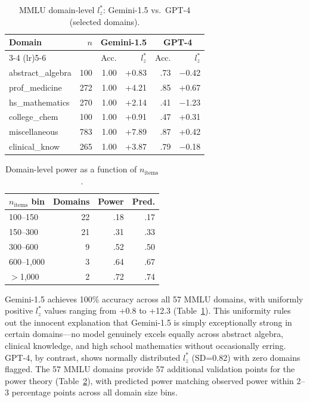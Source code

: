 \documentclass[11pt,a4paper]{article}
\begin{document}
\begin{table}[t]
\centering
\caption{MMLU domain-level $l_z^*$: Gemini-1.5 vs.\ GPT-4 (selected domains).}
\label{tab:domain}
\small
\begin{tabular}{lrrrrr}
\toprule
\textbf{Domain} & $n$ & \multicolumn{2}{c}{\textbf{Gemini-1.5}} & \multicolumn{2}{c}{\textbf{GPT-4}} \\
\cmidrule(lr){3-4} \cmidrule(lr){5-6}
 & & Acc. & $l_z^*$ & Acc. & $l_z^*$ \\
\midrule
abstract\_algebra & 100 & 1.00 & +0.83 & .73 & $-$0.42 \\
prof\_medicine & 272 & 1.00 & +4.21 & .85 & +0.67 \\
hs\_mathematics & 270 & 1.00 & +2.14 & .41 & $-$1.23 \\
college\_chem & 100 & 1.00 & +0.91 & .47 & +0.31 \\
miscellaneous & 783 & 1.00 & +7.89 & .87 & +0.42 \\
clinical\_know & 265 & 1.00 & +3.87 & .79 & $-$0.18 \\
\bottomrule
\end{tabular}
\end{table}

\begin{table}[t]
\centering
\caption{Domain-level power as a function of $n_{\text{items}}$.}
\label{tab:domain-power}
\small
\begin{tabular}{lrrr}
\toprule
$n_{\text{items}}$ \textbf{bin} & \textbf{Domains} & \textbf{Power} & \textbf{Pred.} \\
\midrule
100--150 & 22 & .18 & .17 \\
150--300 & 21 & .31 & .33 \\
300--600 & 9 & .52 & .50 \\
600--1{,}000 & 3 & .64 & .67 \\
$>$1{,}000 & 2 & .72 & .74 \\
\bottomrule
\end{tabular}
\end{table}

Gemini-1.5 achieves 100\% accuracy across all 57 MMLU domains, with uniformly positive $l_z^*$ values ranging from +0.8 to +12.3 (Table~\ref{tab:domain}). This uniformity rules out the innocent explanation that Gemini-1.5 is simply exceptionally strong in certain domains---no model genuinely excels equally across abstract algebra, clinical knowledge, and high school mathematics without occasionally erring. GPT-4, by contrast, shows normally distributed $l_z^*$ (SD=0.82) with zero domains flagged. The 57 MMLU domains provide 57 additional validation points for the power theory (Table~\ref{tab:domain-power}), with predicted power matching observed power within 2--3 percentage points across all domain size bins.
\end{document}
